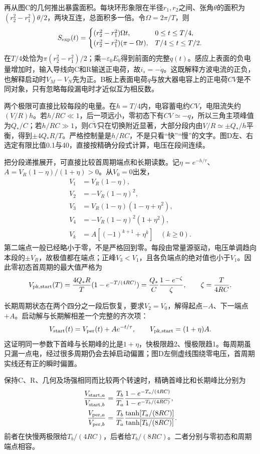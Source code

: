 \documentclass[UTF8,fontset=fandol,a4paper,11pt]{ctexart}
\begin{document}
再从图C的几何推出暴露面积。每块环形象限在半径$r_1,r_2$之间、张角$\theta$的面积为$(r_2^2-r_1^2)\theta/2$，两块互连，总面积多一倍。令$\Omega=2\pi/T$，则
\[
S_{\rm exp}(t)=
\begin{cases}
(r_2^2-r_1^2)\Omega t,&0\le t\le T/4,\\
(r_2^2-r_1^2)(\pi-\Omega t),&T/4\le t\le T/2.
\end{cases}
\]
在$T/4$处恰为$\pi(r_2^2-r_1^2)/2$；乘$-\varepsilon_0E_0$得到前面的完整$q(t)$。感应上表面的负电量增加时，输入导线向C和R输送正电荷，故$i_s=-\dot q$。这既解释方波电流的正负，也解释启动时$V_M-V_N$先为正。B板上表面电荷$q$与放大器电容上的正电荷$CV$是不同对象，只有忽略每段漏电时才近似互为相反数。

两个极限可直接比较每段的电量。在$h=T/4$内，电容蓄电约$CV$，电阻流失约$(V/R)h$。若$h/RC\ll1$，后一项远小，零初态下有$CV\simeq-q$，所以三角主项峰值为$Q_*/C$；若$h/RC\gg1$，则$C\dot V$只在切换附近显著，大部分段内由$V/R\simeq\pm Q_*/h$平衡，得到$\pm4Q_*R/T$。严格控制量是$h/RC$，不是只看“快”“慢”的文字。图D左、右选定有限比值0.1与40，直接按精确分段式计算，电压在段间连续。

把分段递推展开，可直接比较首周期端点和长期读数。记$\eta=e^{-h/\tau}$、$A=V_R(1-\eta)/(1+\eta)>0$。从$V_0=0$出发，
\[
\begin{aligned}
V_1&=V_R(1-\eta),\\
V_2&=-V_R(1-\eta)^2,\\
V_3&=V_R(1-\eta)(1-\eta+\eta^2),\\
V_4&=-V_R(1-\eta)^2(1+\eta^2),\\
V_k&=A[(-1)^{k+1}+\eta^k]\quad(k\ge0).
\end{aligned}
\]
第二端点一般已经略小于零，不是严格回到零。每段由常量源驱动，电压单调趋向本段的$\pm V_R$，故极值都在端点；正峰$V_3<V_1$，且各负端点的绝对值也小于$V_1$。因此零初态首周期的最大值严格为
\[
V_{\rm pk,start}(T)=\frac{4Q_*R}{T}
 (1-e^{-T/(4RC)})
=\frac{Q_*}{C}\frac{1-e^{-\zeta}}{\zeta},
\qquad \zeta=\frac{T}{4RC}.
\]

长期周期状态在两个四分之一段后恢复，要求$V_2=V_0$，解得起点$-A$、下一端点$+A$。启动解与长期解相差一个完整的齐次项：
\[
V_{\rm start}(t)=V_{\rm per}(t)+A e^{-t/\tau},\qquad
V_{{\rm pk,start}}=(1+\eta)A.
\]
这证明同一参数下首峰与长期峰的比是$1+\eta$，快极限趋2、慢极限趋1。每周期虽只漏一点电，经过很多周期仍会去掉启动偏置；图D左侧虚线围绕零电压，首周期实线还有正的瞬时偏置。

保持C、R、几何及场强相同而比较两个转速时，精确首峰比和长期峰比分别为
\[
\begin{aligned}
\frac{V_{{\rm start},a}}{V_{{\rm start},b}}
&=\frac{T_b}{T_a}
 \frac{1-e^{-T_a/(4RC)}}{1-e^{-T_b/(4RC)}},\\
\frac{V_{{\rm per},a}}{V_{{\rm per},b}}
&=\frac{T_b}{T_a}
 \frac{\tanh[T_a/(8RC)]}{\tanh[T_b/(8RC)]}.
\end{aligned}
\]
前者在快慢两极限给$T_b/(4RC)$，后者给$T_b/(8RC)$。二者分别与零初态和周期端点相容。
\end{document}
